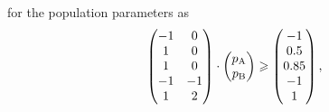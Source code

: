 for the population parameters as
\begin{equation}
    \begin{pmatrix}
        -1 & 0 \\
         1 & 0 \\
         1 & 0 \\
        -1 &-1 \\
         1 & 2 \\
    \end{pmatrix}
    \cdot
    \begin{pmatrix}
        p_\textrm{A} \\
        p_\textrm{B} \\
    \end{pmatrix}
    \geqslant
    \begin{pmatrix}
        -1 \\
        0.5 \\
        0.85 \\
        -1 \\
        1 \\
    \end{pmatrix},
\end{equation}

